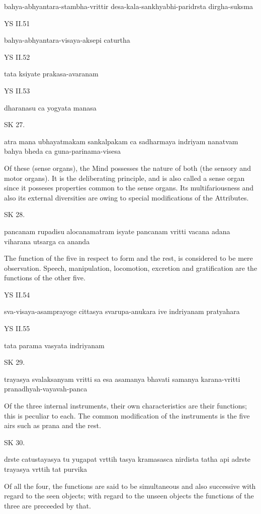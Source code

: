     bahya-abhyantara-stambha-vrittir desa-kala-sankhyabhi-paridrsta dirgha-suksma

YS II.51

    bahya-abhyantara-visaya-aksepi caturtha

YS II.52
   
    tata ksiyate prakasa-avaranam

YS II.53
   
    dharanasu ca yogyata manasa

SK 27.

atra mana ubhayatmakam sankalpakam ca sadharmaya indriyam
nanatvam bahya bheda ca guna-parinama-visesa

Of these (sense organs), the Mind possesses the nature of both
(the sensory and motor organs).
It is the deliberating principle, and is also called a sense organ
since it posseses properties common to the sense organs.
Its multifariousness and also its external diversities are owing
to special modifications of the Attributes.

SK 28.

pancanam rupadisu alocanamatram isyate
pancanam vritti vacana adana viharana utsarga ca ananda

The function of the five in respect to form and the rest,
is considered to be mere observation.
Speech, manipulation, locomotion, excretion and gratification
are the functions of the other five.

YS II.54
   
    sva-visaya-asamprayoge cittasya svarupa-anukara ive indriyanam pratyahara

YS II.55

    tata parama vasyata indriyanam

SK 29.

trayasya svalaksanyam vritti sa esa asamanya bhavati
samanya karana-vritti pranadhyah-vayavah-panca

Of the three internal instruments, their own characteristics are their functions;
this is peculiar to each.
The common modification of the instruments is the five airs
such as prana and the rest.

SK 30.

drste catustayasya tu yugapat vrttih tasya kramasasca nirdista
tatha api adrste trayasya vrttih tat purvika

Of all the four, the functions are said to be simultaneous and also successive
with regard to the seen objects;
with regard to the unseen objects
the functions of the three are preceeded by that.

